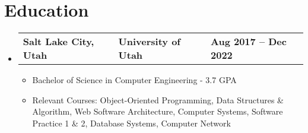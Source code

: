 \documentclass[letterpaper,11pt]{article}
\begin{document}

\section{\textbf{Education}}
\begin{itemize}[leftmargin=0.05in, label={}]
	\item{
	            \begin{tabu} {X[l] X[c] X[r]}
		            \textbf{Salt Lake City, Utah} & \textbf{University of Utah} & \textbf{Aug 2017 -- Dec 2022} \\
	            \end{tabu}

	            \begin{itemize} [label=$\bullet$]
		            \item{Bachelor of Science in Computer Engineering - 3.7 GPA}
		            \item{Relevant Courses{: Object-Oriented Programming, Data Structures \& Algorithm, Web Software Architecture, Computer Systems, Software Practice 1 \& 2, Database Systems, Computer Network} }
	            \end{itemize}
	      }
\end{itemize}


\end{document}
